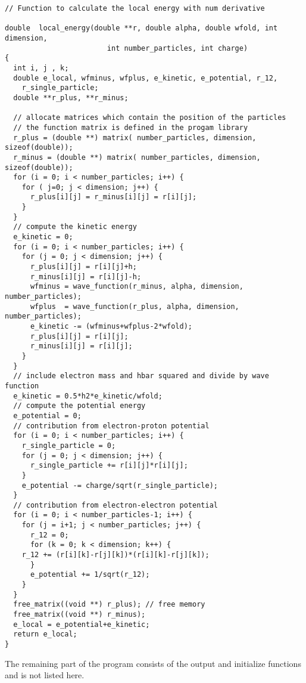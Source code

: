 \begin{lstlisting}
// Function to calculate the local energy with num derivative

double  local_energy(double **r, double alpha, double wfold, int dimension, 
                        int number_particles, int charge)
{
  int i, j , k;
  double e_local, wfminus, wfplus, e_kinetic, e_potential, r_12, 
    r_single_particle;
  double **r_plus, **r_minus;
  
  // allocate matrices which contain the position of the particles  
  // the function matrix is defined in the progam library 
  r_plus = (double **) matrix( number_particles, dimension, sizeof(double));
  r_minus = (double **) matrix( number_particles, dimension, sizeof(double));
  for (i = 0; i < number_particles; i++) { 
    for ( j=0; j < dimension; j++) {
      r_plus[i][j] = r_minus[i][j] = r[i][j];
    }
  }
  // compute the kinetic energy  
  e_kinetic = 0;
  for (i = 0; i < number_particles; i++) {
    for (j = 0; j < dimension; j++) { 
      r_plus[i][j] = r[i][j]+h;
      r_minus[i][j] = r[i][j]-h;
      wfminus = wave_function(r_minus, alpha, dimension, number_particles); 
      wfplus  = wave_function(r_plus, alpha, dimension, number_particles); 
      e_kinetic -= (wfminus+wfplus-2*wfold);
      r_plus[i][j] = r[i][j];
      r_minus[i][j] = r[i][j];
    }
  }
  // include electron mass and hbar squared and divide by wave function 
  e_kinetic = 0.5*h2*e_kinetic/wfold;
  // compute the potential energy 
  e_potential = 0;
  // contribution from electron-proton potential  
  for (i = 0; i < number_particles; i++) { 
    r_single_particle = 0;
    for (j = 0; j < dimension; j++) { 
      r_single_particle += r[i][j]*r[i][j];
    }
    e_potential -= charge/sqrt(r_single_particle);
  }
  // contribution from electron-electron potential  
  for (i = 0; i < number_particles-1; i++) { 
    for (j = i+1; j < number_particles; j++) {
      r_12 = 0;  
      for (k = 0; k < dimension; k++) { 
	r_12 += (r[i][k]-r[j][k])*(r[i][k]-r[j][k]);
      }
      e_potential += 1/sqrt(r_12);          
    }
  }
  free_matrix((void **) r_plus); // free memory
  free_matrix((void **) r_minus);
  e_local = e_potential+e_kinetic;
  return e_local;
}
\end{lstlisting}
The remaining part of the program consists of the output and initialize functions and is not listed here. 


